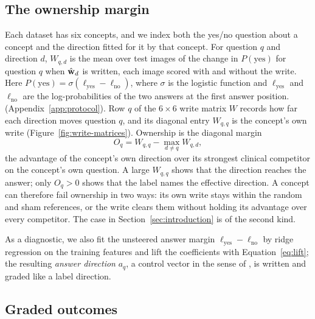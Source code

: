 \subsection{The ownership margin}
\label{sec:ownership}

Each dataset has six concepts, and we index both the yes/no question about a concept and the direction fitted for it by that concept. For question $q$ and direction $d$, $W_{q,d}$ is the mean over test images of the change in $P(\mathrm{yes})$ for question $q$ when $\hat{\mathbf{w}}_d$ is written, each image scored with and without the write. Here $P(\mathrm{yes})=\sigma(\ell_{\mathrm{yes}}-\ell_{\mathrm{no}})$, where $\sigma$ is the logistic function and $\ell_{\mathrm{yes}}$ and $\ell_{\mathrm{no}}$ are the log-probabilities of the two answers at the first answer position. (Appendix~\ref{app:protocol}). Row $q$ of the $6\times6$ write matrix $W$ records how far each direction moves question $q$, and its diagonal entry $W_{q,q}$ is the concept's own write (Figure~\ref{fig:write-matrices}). Ownership is the diagonal margin
\begin{equation}
O_q=W_{q,q}-\max_{d\neq q}W_{q,d},
\label{eq:margin}
\end{equation}
the advantage of the concept's own direction over its strongest clinical competitor on the concept's own question. A large $W_{q,q}$ shows that the direction reaches the answer; only $O_q>0$ shows that the label names the effective direction. A concept can therefore fail ownership in two ways: its own write stays within the random and sham references, or the write clears them without holding its advantage over every competitor. The case in Section~\ref{sec:introduction} is of the second kind.

As a diagnostic, we also fit the unsteered answer margin $\ell_{\mathrm{yes}}-\ell_{\mathrm{no}}$ by ridge regression on the training features and lift the coefficients with Equation~\ref{eq:lift}; the resulting \emph{answer direction} $a_q$, a control vector in the sense of \citet{zou2023representation}, is written and graded like a label direction.

\subsection{Graded outcomes}
\label{sec:grades}

